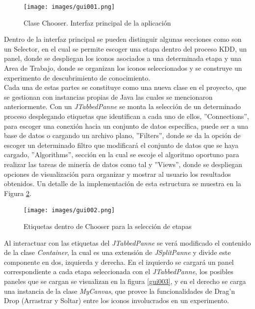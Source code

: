 \begin{figure}[h]
\centering
\texttt{[image: images/gui001.png]}               
\caption{Clase Chooser.  Interfaz principal de la aplicaci\'on}
\label{gui001}
\end{figure}

Dentro de la interfaz principal se pueden distinguir algunas secciones como son un Selector, en el cual se permite
escoger una etapa dentro del proceso KDD, un panel, donde se despliegan los iconos asociados a una determinada
etapa y una Area de Trabajo, donde se organizan los iconos seleccionados y se construye un experimento de
descubrimiento de conocimiento.\\

Cada una de estas partes se constituye como una nueva clase en el proyecto, que se gestionan con instancias
propias de Java las cuales se mencionaron anteriormente.  Con un \textit{JTabbedPanne} se monta la selecci\'on de
un determinado proceso desplegando etiquetas que identifican a cada uno de ellos, ''Connections'', para escoger
una conexi\'on hacia un conjunto de datos espec\'ifica, puede ser a una base de datos o cargando un archivo plano,
''Filters'', donde se da la opci\'on de escoger un determinado filtro que modificar\'a el conjunto de datos que se
haya cargado,  ''Algorithms'', secci\'on en la cual se escoje el algoritmo oportuno para realizar las tareas de
miner\'ia de datos como tal y ''Views'', donde se despliegan opciones de visualizaci\'on para organizar y mostrar
al usuario los resultados obtenidos.  Un detalle de la implementaci\'on de esta estructura se muestra en la Figura
\ref{gui002}.\\

\begin{figure}[h]
\centering
\texttt{[image: images/gui002.png]}               
\caption{Etiquetas dentro de Chooser para la selecci\'on de etapas }
\label{gui002}
\end{figure}

Al interactuar con las etiquetas del \textit{JTabbedPanne} se ver\'a modificado el contenido de la clase
\textit{Container}, la cual es una extensi\'on de \textit{JSplitPanne}  y divide este componente en dos, izquierda
y derecha.  En el izquierdo se cargar\'a un panel correspondiente a cada etapa seleccionada con el
\textit{JTabbedPanne}, los posibles paneles que se cargan se visualizan en la figura \ref{gui003}, y en el derecho
se carga una instancia de la clase \textit{MyCanvas}, que provee la funcionalidades de Drag'n Drop (Arrastrar y
Soltar) entre los iconos involucrados en un experimento.\\

